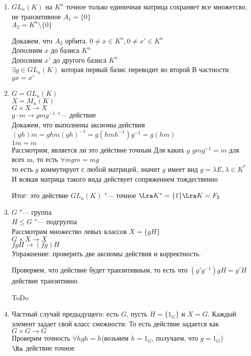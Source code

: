 \begin{exmp}\hfill
\begin{enumerate}
\item $GL_n(K)$ на $K^n$
точное только единичная матрица сохраняет все множетсво, не транзитивное
$A_1 = \{0\}$\\
$A_2 = K^n\setminus \{0\}$

Докажем, что $A_2$ орбита.
$0 \ne x \in K^{n}, 0 \ne x' \in K^n$\\
Дополним $x$ до базиса $K^n$\\
Дополним $x'$ до другого базиса $K^n$\\
$\exists g\in GL_n(K)$ которая первый базис переводит во второй
В частности $gx = x'$\\
\item 
$G = GL_n(K)$ \\
$X = M_n(K)$ \\
$G \times X \to X$ \\
$g \cdot m \to gmg^{-1}$ "--- действие\\
Докажем, что выполнены аксиомы действия\\
$(gh)m = ghm(gh)^{-1} = g(hmh^{-1})g^{-1} = g(hm)$\\
$1m = m$\\

Рассмотрим, является ли это действие точным 
Для каких $g$ $gmg^{-1} = m$ для всех m, то есть $\forall m gm = mg$\\
то есть $g$ коммутирует с любой матрицей, значит $g$ имеет вид 
$g = \lambda E, \lambda \in K^{*}$\\
И всякая матрица такого вида действует сопряжением тождественно

Итог: это действие $GL_n(K)$  "--- точное $\Lra K^* = \{1\} \Lra K = F_2$ \\
\item
$G$ "--- группа \\
$H \le G$ "--- подгруппа\\
Рассмотрим множество левых классов $X = \{gH\}$\\
$G \times X \to X$\\
$f gH \to (fg)H$\\
Упражнение: проверить две аксиомы действия и корректность. 

Проверяем, что действие будет транзитивным, то есть что 
$(g'g^{-1})gH = g'H$ действие транзитивно.

ToDo
\item
Частный случай предыдущего: есть $G$, пусть $H=\{1_G\}$ и $X=G$.
Каждый элемент задает свой класс смежности. 
То есть действие задается как 
$G \times G \to G$\\
Проверим точность
$\forall h gh = h$(возьмем $h = 1_G$, получаем, что $g = 1_G$)\\
$\Ra$ действие точное


\end{enumerate}
\end{exmp}
